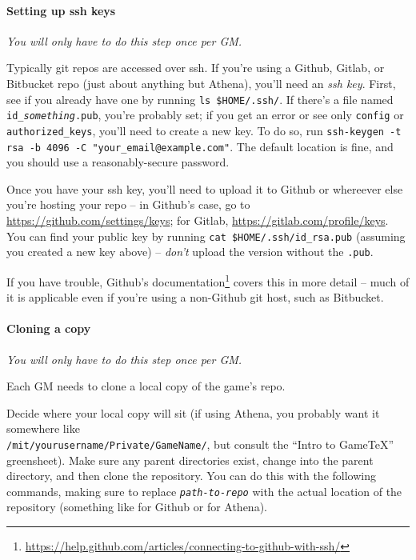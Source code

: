 \documentclass[green]{testgame}
\begin{document}
\paragraph*{Setting up ssh keys} \emph{You will only have to do this step once per GM.}

Typically git repos are accessed over ssh. If you're using a Github, Gitlab, or Bitbucket repo (just about anything but Athena), you'll need an \emph{ssh key}. First, see if you already have one by running \texttt{ls \$HOME/.ssh/}. If there's a file named \texttt{id\_\emph{something}.pub}, you're probably set; if you get an error or see only \texttt{config} or \texttt{authorized\_keys}, you'll need to create a new key. To do so, run \texttt{ssh-keygen -t rsa -b 4096 -C "your\_email@example.com"}. The default location is fine, and you should use a reasonably-secure password.

Once you have your ssh key, you'll need to upload it to Github or whereever else you're hosting your repo -- in Github's case, go to \url{https://github.com/settings/keys}; for Gitlab, \url{https://gitlab.com/profile/keys}. You can find your public key by running \texttt{cat \$HOME/.ssh/id\_rsa.pub} (assuming you created a new key above) -- \emph{don't} upload the version without the \texttt{.pub}.

If you have trouble, Github's documentation\footnote{\url{https://help.github.com/articles/connecting-to-github-with-ssh/}} covers this in more detail -- much of it is applicable even if you're using a non-Github git host, such as Bitbucket.

\paragraph*{Cloning a copy} \emph{You will only have to do this step once per GM.}

Each GM needs to clone a local copy of the game's repo.

Decide where your local copy will sit (if using Athena, you probably want it
somewhere like\\ {\tt /mit/yourusername/Private/GameName/}, but consult the
``Intro to GameTeX'' greensheet). Make sure any parent directories exist,
change into the parent directory, and then clone the repository. You can do
this with the following commands, making sure to replace
\texttt{\emph{path-to-repo}} with the actual location of the repository
(something like  for Github or
 for Athena).
\end{document}
